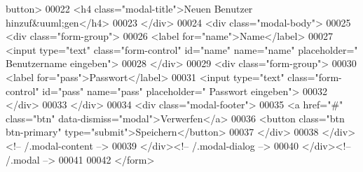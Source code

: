 \begin{DoxyCode}
      button>
00022                   <h4 \textcolor{keyword}{class}=\textcolor{stringliteral}{"modal-title"}>Neuen Benutzer hinzuf&uuml;gen</h4>
00023                 </div>
00024                 <div \textcolor{keyword}{class}=\textcolor{stringliteral}{"modal-body"}>
00025                   <div \textcolor{keyword}{class}=\textcolor{stringliteral}{"form-group"}>
00026                             <label \textcolor{keywordflow}{for}=\textcolor{stringliteral}{"name"}>Name</label>
00027                             <input type=\textcolor{stringliteral}{"text"} \textcolor{keyword}{class}=\textcolor{stringliteral}{"form-control"} \textcolor{keywordtype}{id}=\textcolor{stringliteral}{"name"} name=\textcolor{stringliteral}{"name"} placeholder=\textcolor{stringliteral}{"
      Benutzername eingeben"}>
00028                           </div>
00029                           <div \textcolor{keyword}{class}=\textcolor{stringliteral}{"form-group"}>
00030                             <label \textcolor{keywordflow}{for}=\textcolor{stringliteral}{"pass"}>Passwort</label>
00031                             <input type=\textcolor{stringliteral}{"text"} \textcolor{keyword}{class}=\textcolor{stringliteral}{"form-control"} \textcolor{keywordtype}{id}=\textcolor{stringliteral}{"pass"} name=\textcolor{stringliteral}{"pass"} placeholder=\textcolor{stringliteral}{"
      Passwort eingeben"}>
00032                           </div>
00033                 </div>
00034                 <div \textcolor{keyword}{class}=\textcolor{stringliteral}{"modal-footer"}>
00035                   <a href=\textcolor{stringliteral}{"#"} \textcolor{keyword}{class}=\textcolor{stringliteral}{"btn"} data-dismiss=\textcolor{stringliteral}{"modal"}>Verwerfen</a>
00036                   <button \textcolor{keyword}{class}=\textcolor{stringliteral}{"btn btn-primary"} type=\textcolor{stringliteral}{"submit"}>Speichern</button>
00037                 </div>
00038               </div><!-- /.modal-content -->
00039             </div><!-- /.modal-dialog -->
00040           </div><!-- /.modal -->
00041           
00042           </form>
\end{DoxyCode}
